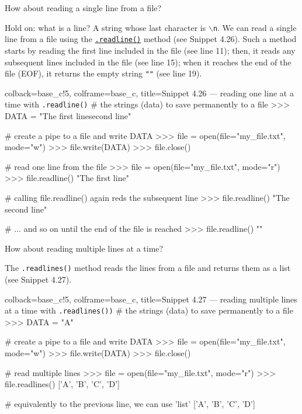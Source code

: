 \documentclass[a4paper,11pt]{book}
\numberwithin{figure}{chapter}
\numberwithin{table}{chapter}
\newcommand{\question}[1]{%
    \begin{tcolorbox}[colback=comp_c!10,colframe=comp_c,sidebyside align=top,width=\linewidth,before skip=1ex]
        #1
    \end{tcolorbox}
    \switchcolumn%
}
\newcommand{\note}[1]{%
    \begin{tcolorbox}[colback=white!0,colframe=white!10,width=\linewidth,before skip=1ex]
        #1
    \end{tcolorbox}
}
\begin{document}
\begin{paracol}{2}
	\question{\raggedright How about reading a single line from a file?}
	\note{Hold on: what is a line? A string whose last character is \texttt{$\backslash$n}. We can read a single line from a file using the \href{https://docs.python.org/3/tutorial/inputoutput.html\#methods-of-file-objects}{\texttt{.readline()}} method (see Snippet 4.26). Such a method starts by reading the first line included in the file (see line 11); then, it reads any subsequent lines included in the file (see line 15); when it reaches the end of the file (EOF), it returns the empty string \texttt{""} (see line 19).}
\end{paracol}
\clearpage 

\begin{pythoncode}[linenos=true,]{colback=base_c!5, colframe=base_c, title=\sffamily Snippet 4.26 --- reading one line at a time with \texttt{.readline()}}
# the strings (data) to save permanently to a file
>>> DATA = "The first line\nThe second line" 

# create a pipe to a file and write DATA
>>> file = open(file="my_file.txt", mode="w")
>>> file.write(DATA)
>>> file.close()

# read one line from the file
>>> file = open(file="my_file.txt", mode="r")
>>> file.readline()
"The first line\n"

# calling file.readline() again reds the subsequent line 
>>> file.readline()
"The second line"

# ... and so on until the end of the file is reached
>>> file.readline()
""
\end{pythoncode}

\begin{paracol}{2}
	\question{\raggedright How about reading multiple lines at a time?}
	\note{The \texttt{.readlines()} method reads the lines from a file and returns them as a list (see Snippet 4.27).}
\end{paracol}

\begin{pythoncode}[linenos=true,]{colback=base_c!5, colframe=base_c, title=\sffamily Snippet 4.27 --- reading multiple lines at a time with \texttt{.readlines())}}
# the strings (data) to save permanently to a file
>>> DATA = "A\nB\nC\nD" 

# create a pipe to a file and write DATA
>>> file = open(file="my_file.txt", mode="w")
>>> file.write(DATA)
>>> file.close()

# read multiple lines 
>>> file = open(file="my_file.txt", mode="r")
>>> file.readlines()
['A\n', 'B\n', 'C\n', 'D']

# equivalently to the previous line, we can use 'list'
['A\n', 'B\n', 'C\n', 'D']
\end{pythoncode}	
\end{document}
